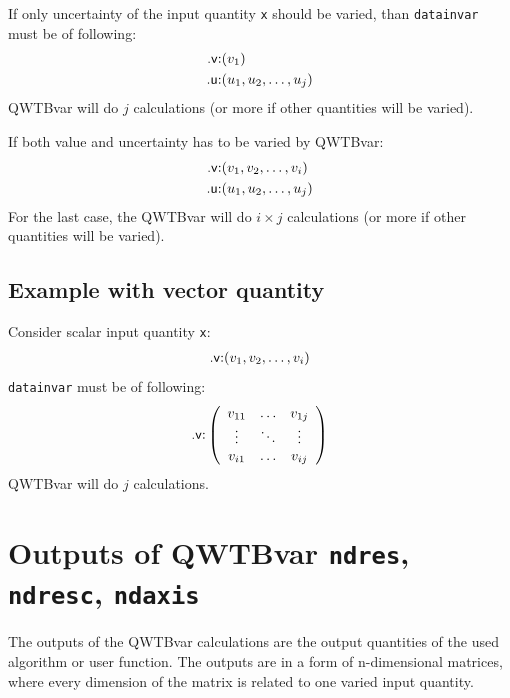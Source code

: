 \documentclass[12pt,a4paper,oneside]{report} %
\newcommand{\li}[1]{\lstinline{#1}}     %
\begin{document}
If only uncertainty of the input quantity \li{x} should be varied, than
\li{datainvar} must be of following:
\begin{eqnarray*}
    \text{\textsf{.v}:} & (v_1)\\
    \text{\textsf{.u}:} & (u_1, u_2, \dots, u_j)\\
\end{eqnarray*}
QWTBvar will do $j$ calculations (or more if other quantities will be varied).

If both value and uncertainty has to be varied by QWTBvar:
\begin{eqnarray*}
    \text{\textsf{.v}:} & (v_1, v_2, \dots, v_i)\\
    \text{\textsf{.u}:} & (u_1, u_2, \dots, u_j)\\
\end{eqnarray*}
For the last case, the QWTBvar will do $i\times j$ calculations (or more if other quantities will be varied).

\subsection{Example with vector quantity}
Consider scalar input quantity \li{x}:
\begin{eqnarray*}
    \text{\textsf{.v}:} & (v_1, v_2, \dots, v_i)\\
\end{eqnarray*}
\li{datainvar} must be of following:
\begin{eqnarray*}
    \text{\textsf{.v}:} & \left(    \begin{array}{ccc}
                                            v_{11}  & \hdots & v_{1j} \\
                                            \vdots  & \ddots & \vdots \\
                                            v_{i1}  & \hdots & v_{ij} \\
                                    \end{array}\right) \\
\end{eqnarray*}
QWTBvar will do $j$ calculations.

\section{Outputs of QWTBvar {\tt ndres}, {\tt ndresc}, {\tt ndaxis}}
\label{S:QWTBvar:ndres}
The outputs of the QWTBvar calculations are the output quantities of the used
algorithm or user function. The outputs are in a form of n-dimensional
matrices, where every dimension of the matrix is related to one varied input
quantity.
\end{document}
